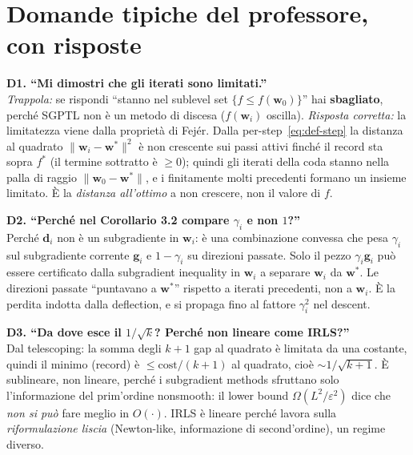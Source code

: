 \documentclass[11pt,a4paper]{article}
\theoremstyle{definition}
\newcommand{\w}{\bm{w}}
\newcommand{\g}{\bm{g}}
\newcommand{\dvec}{\bm{d}}
\newcommand{\wstar}{\w^{*}}
\newcommand{\fstar}{f^{*}}
\newcommand{\eps}{\varepsilon}
\newcommand{\norm}[1]{\lVert #1\rVert}
\begin{document}
\section{Domande tipiche del professore, con risposte}
\label{sec:orale}

\begin{oralbox}
\textbf{D1. ``Mi dimostri che gli iterati sono limitati.''}\\
\emph{Trappola:} se rispondi ``stanno nel sublevel set $\{f\le f(\w_0)\}$'' hai
\textbf{sbagliato}, perché SGPTL non è un metodo di discesa ($f(\w_i)$ oscilla). \emph{Risposta
corretta:} la limitatezza viene dalla proprietà di Fej\'er. Dalla per-step~\eqref{eq:def-step}
la distanza al quadrato $\norm{\w_i-\wstar}^2$ è non crescente sui passi attivi finché il
record sta sopra $\fstar$ (il termine sottratto è $\ge0$); quindi gli iterati della coda
stanno nella palla di raggio $\norm{\w_0-\wstar}$, e i finitamente molti precedenti formano un
insieme limitato. È la \emph{distanza all'ottimo} a non crescere, non il valore di $f$.
\end{oralbox}

\begin{oralbox}
\textbf{D2. ``Perché nel Corollario 3.2 compare $\gamma_i$ e non $1$?''}\\
Perché $\dvec_i$ non è un subgradiente in $\w_i$: è una combinazione convessa che pesa
$\gamma_i$ sul subgradiente corrente $\g_i$ e $1-\gamma_i$ su direzioni passate. Solo il pezzo
$\gamma_i\g_i$ può essere certificato dalla subgradient inequality in $\w_i$ a separare $\w_i$
da $\wstar$. Le direzioni passate ``puntavano a $\wstar$'' rispetto a iterati precedenti, non a
$\w_i$. È la perdita indotta dalla deflection, e si propaga fino al fattore $\gamma_i^2$ nel
descent.
\end{oralbox}

\begin{oralbox}
\textbf{D3. ``Da dove esce il $1/\sqrt{k}$? Perché non lineare come IRLS?''}\\
Dal telescoping: la somma degli $k+1$ gap al quadrato è limitata da una costante, quindi il
minimo (record) è $\le\text{cost}/(k+1)$ al quadrato, cioè $\sim1/\sqrt{k+1}$. È sublineare,
non lineare, perché i subgradient methods sfruttano solo l'informazione del prim'ordine
nonsmooth: il lower bound $\Omega(L^2/\eps^2)$ dice che \emph{non si può} fare meglio in
$O(\cdot)$. IRLS è lineare perché lavora sulla \emph{riformulazione liscia} (Newton-like,
informazione di second'ordine), un regime diverso.
\end{oralbox}
\end{document}
